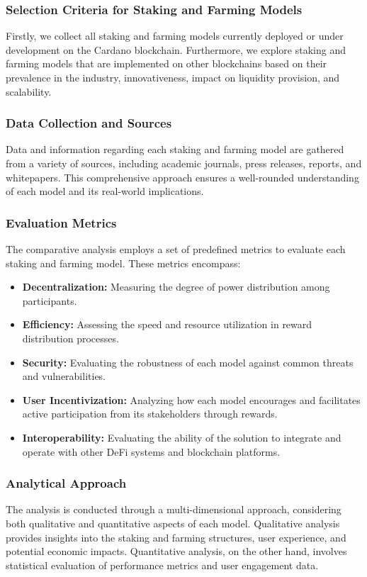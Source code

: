 \documentclass[12pt,parskip=full, tikz]{article}
\begin{document}
\subsubsection{Selection Criteria for Staking and Farming Models}

Firstly, we collect all staking and farming models currently deployed or under development on the Cardano blockchain. Furthermore, we explore staking and farming models that are implemented on other blockchains based on their prevalence in the industry, innovativeness, impact on liquidity provision, and scalability.

\subsubsection{Data Collection and Sources}
Data and information regarding each staking and farming model are gathered from a variety of sources, including academic journals, press releases, reports, and whitepapers. This comprehensive approach ensures a well-rounded understanding of each model and its real-world implications.

\subsubsection{Evaluation Metrics}
The comparative analysis employs a set of predefined metrics to evaluate each staking and farming model. These metrics encompass:

\begin{itemize}
    \item \textbf{Decentralization:} Measuring the degree of power distribution among participants.
    \item \textbf{Efficiency:} Assessing the speed and resource utilization in reward distribution processes.
    \item \textbf{Security:} Evaluating the robustness of each model against common threats and vulnerabilities.
    \item \textbf{User Incentivization:} Analyzing how each model encourages and facilitates active participation from its stakeholders through rewards.
    \item \textbf{Interoperability:} Evaluating the ability of the solution to integrate and operate with other DeFi systems and blockchain platforms.
\end{itemize}

\subsubsection{Analytical Approach}
The analysis is conducted through a multi-dimensional approach, considering both qualitative and quantitative aspects of each model. Qualitative analysis provides insights into the staking and farming structures, user experience, and potential economic impacts. Quantitative analysis, on the other hand, involves statistical evaluation of performance metrics and user engagement data.
\end{document}
